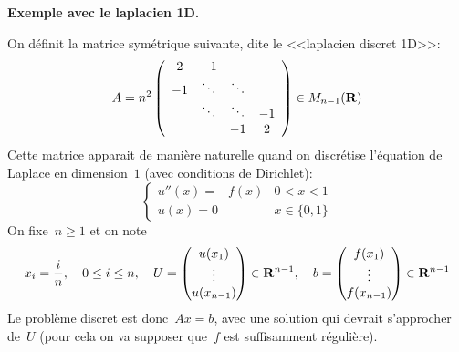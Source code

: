 {\bf Exemple avec le laplacien 1D.}

On définit la matrice symétrique suivante, dite le <<laplacien discret 1D>>:
\begin{equation}
\label{eq:A}
A = n^2 \left(\begin{array}{cccc}
2 & -1 & &  \\
-1 & \ddots & \ddots & \\
  & \ddots & \ddots & -1 \\
 & & -1 & 2
\end{array}\right) \in M_{n-1}(\mathbf{R})
\end{equation}
Cette matrice apparait de manière naturelle quand on discrétise l'équation de
Laplace en dimension~$1$ (avec conditions de Dirichlet):
\begin{equation*}
	\begin{cases}
		u''(x)  = -f(x) & 0 < x < 1 \\
		u(x) = 0 & x\in\{0,1\}
\end{cases}
\end{equation*}
On fixe~$n\ge 1$ et on note
\[
	x_i = \frac{i}{n}, \quad 0 \leq i \leq n, \quad U = \begin{pmatrix}u(x_1)
		\\ \vdots \\ u(x_{n-1})\end{pmatrix} \in \mathbf{R}^{n-1}, \quad  b =
		\begin{pmatrix}f(x_1) \\ \vdots \\ f(x_{n-1})\end{pmatrix} \in \mathbf{R}^{n-1}
\]
Le problème discret est donc~$Ax=b$, avec une solution qui devrait
s'approcher de~$U$ (pour cela on va supposer que~$f$ est suffisamment
régulière).


